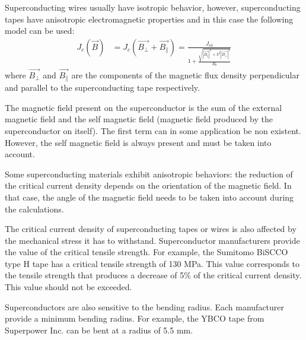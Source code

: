 \documentclass{ws-jmrr}
\begin{document}
\begin{multicols}{2}
Superconducting wires usually have isotropic behavior, however, superconducting tapes have anisotropic electromagnetic properties and in this case the following model can be used:
\begin{align}
J_c(\vec{B})&=J_c(\vec{B_{\perp}}+\vec{B_{\parallel}})=\frac{J_{c0}}{1+\frac{\sqrt{|\vec{B_{\parallel}}|^2+k^2|\vec{B_{\perp}}|^2}}{B_0}}
\label{model2}
\end{align}
where $\vec{B_{\perp}}$ and $\vec{B_{\parallel}}$ are the components of the magnetic flux density perpendicular and parallel to the superconducting tape respectively.\par
The magnetic field present on the superconductor is the sum of the external magnetic field and the self magnetic field (magnetic field produced by the superconductor on itself). The first term can in some application be non existent. However, the self magnetic field is always present and must be taken into account. \par
Some superconducting materials exhibit anisotropic behaviors: the reduction of the critical current density depends on the orientation of the magnetic field. In that case, the angle of the magnetic field needs to be taken into account during the calculations.\par
The critical current density of superconducting tapes or wires is also affected by the mechanical stress it has to withstand. Superconductor manufacturers provide the value of the critical tensile strength. For example, the Sumitomo BiSCCO type H tape has a critical tensile strength of 130 MPa. This value corresponds to the tensile strength that produces a decrease of 5\% of the critical current density. This value should not be exceeded.\par
Superconductors are also sensitive to the bending radius. Each manufacturer provide a minimum bending radius. For example, the YBCO tape from Superpower Inc. can be bent at a radius of 5.5 mm.






\end{multicols}
\end{document}

